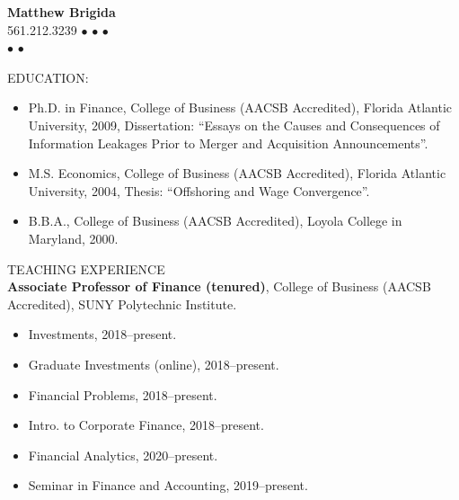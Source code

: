 \documentclass[9pt]{article}
\begin{document}
\fontsize{9}{11}\selectfont
\begin{center}
{\bf  {\Large Matthew Brigida}}\\
\hspace*{22pt}561.212.3239 $\bullet$ \href{mailto: matthew.brigida@sunyit.edu}{} $\bullet$ %
\href{https://github.com/Matt-Brigida}{\color{Blue}{GitHub}} $\bullet$
\href{https://www.youtube.com/channel/UCwekb0vAK-FKaqPF5gfd0eQ?view_as=subscriber}{\color{Blue}{YouTube}}\\
\hspace*{22pt} \href{https://github.com/Matt-Brigida/job_market_materials/raw/master/teaching_phil/teaching_phil.pdf}{\color{Blue}{Statement of Teaching Philosophy}} $\bullet$ \href{https://github.com/Matt-Brigida/job_market_materials/raw/master/Evidence_teaching_effectiveness/Brigida_evidence_teaching_effectiveness.pdf}{\color{Blue}{Evidence of Teaching Effectiveness}} $\bullet$ \href{https://github.com/Matt-Brigida/job_market_materials/raw/master/research_phil/research_phil.pdf}{\color{Blue}{Statement of Research Philosophy}}
\end{center}
EDUCATION:
\begin{itemize}[noitemsep, nolistsep]
\item Ph.D. in Finance, College of Business (AACSB Accredited), Florida Atlantic University, 2009, Dissertation:
``Essays on the Causes and Consequences of Information Leakages Prior to Merger and Acquisition
Announcements''.
\item M.S. Economics, College of Business (AACSB Accredited), Florida Atlantic University, 2004, Thesis: ``Offshoring
and Wage Convergence''.
\item B.B.A., College of Business (AACSB Accredited), Loyola College in Maryland, 2000.
\end{itemize}
\vspace{10pt}
TEACHING EXPERIENCE\\
{\bf Associate Professor of Finance (tenured)}, College of Business (AACSB Accredited), SUNY Polytechnic Institute.
\begin{itemize}[noitemsep, nolistsep]
\item Investments, 2018--present.
\item Graduate Investments (online), 2018--present.
\item Financial Problems, 2018--present.
\item Intro. to Corporate Finance, 2018--present.
\item Financial Analytics, 2020--present.
\item Seminar in Finance and Accounting, 2019--present.
\end{itemize}
\end{document}
